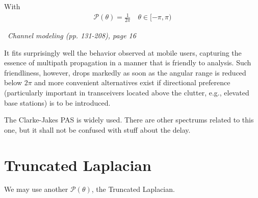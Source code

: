 \documentclass[a4paper, 12pt]{book}
\begin{document}
With
\begin{align}
\mathcal{P}(\theta) = \frac{1}{2\pi} \quad \theta \in [-\pi, \pi) \tag{3.27}
\end{align}

\begin{yellowbox}
\faBook\ \textit{Channel modeling (pp. 131-208), page 16}

It fits surprisingly well the behavior observed at mobile users, capturing the essence of multipath propagation in a manner that is friendly to analysis. Such friendliness, however, drops markedly as soon as the angular range is reduced below $2\pi$ and more convenient alternatives exist if directional preference (particularly important in transceivers located above the clutter, e.g., elevated base stations) is to be introduced.
\end{yellowbox}

The \colorbox{yellow!30}{Clarke-Jakes PAS is widely used}. There are other spectrums related to this one, but it shall not be confused with stuff about the delay.

\section{Truncated Laplacian}

We may use another $\mathcal{P}(\theta)$, the Truncated Laplacian.

\begin{center}
\end{center}
\end{document}
